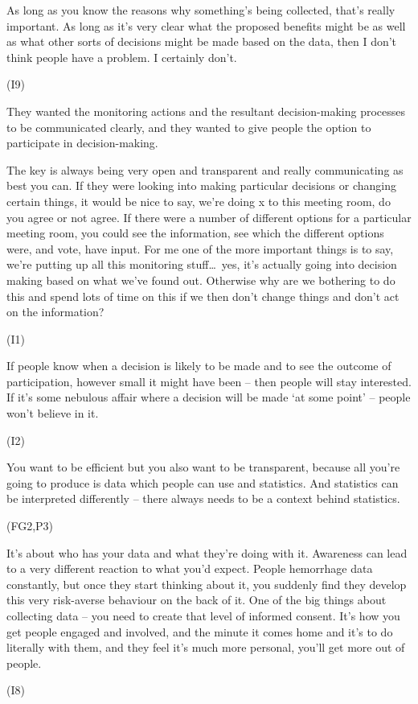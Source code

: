 \begin{qt}As long as you know the reasons why something’s being collected, that’s really important. As long as it’s very clear what the proposed benefits might be as well as what other sorts of decisions might be made based on the data, then I don’t think people have a problem. I certainly don’t.\end{qt} (I9)

They wanted the monitoring actions and the resultant decision-making
processes to be communicated clearly, and they wanted to give people
the option to participate in decision-making.

\begin{qt}The key is always being very open and transparent and really
communicating as best you can. If they were looking into making particular decisions or changing
certain things, it would be nice to say, we’re doing x to this meeting
room, do you agree or not agree. If there
were a number of different options for a particular meeting room, you
could see the information, see which the different options were, and
vote, have input. For me one of the more important things is to say,
we’re putting up all this monitoring stuff\ldots\  yes, it’s actually going
into decision making based on what we’ve found out. Otherwise why are
we bothering to do this and spend lots of time on this if we then
don’t change things and don’t act on the information?\end{qt} (I1)

\begin{qt}If people know when a decision is likely to be made and to see the
outcome of participation, however small it might have been – then
people will stay interested. If it’s some nebulous affair where a
decision will be made ‘at some point’ – people won’t believe in it.\end{qt}
(I2)

\begin{qt}You want to be efficient but you also want to be transparent, because
all you’re going to produce is data which people can use and
statistics. And statistics can be interpreted differently – there
always needs to be a context behind statistics.\end{qt} (FG2,P3)

\begin{qt}It’s about who has your data and what they’re doing with it. Awareness can lead to a very different reaction to what you’d expect. People hemorrhage data constantly, but once they start thinking about it, you suddenly find they develop this very risk-averse behaviour on the back of it. One of the big things about collecting data – you need to create that level of informed consent. It’s how you get people engaged and involved, and the minute it comes home and it’s to do literally with them, and they feel it’s much more personal, you’ll get more out of people.\end{qt} (I8)


